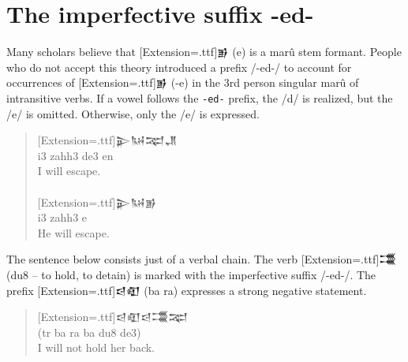\documentclass[a4paper,12pt]{book}
\newcommand{\fcn}{\setmainfont{Akkadian}[Extension=.ttf]}
\newcommand{\fcm}{\large\setmainfont{Akkadian}[Extension=.ttf]}
\begin{document}
\section{The imperfective suffix -ed-}
Many scholars believe that {\fcn 𒂊} (e)
is a marû stem formant. People who do not accept
this theory introduced a prefix /-ed-/ to
account for occurrences of {\fcn 𒂊}  (-e)
in the 3rd person
singular marû of intransitive verbs.
If a vowel follows the \verb|-ed-| prefix,
the /d/ is realized, but
the  /e/ is omitted.
Otherwise, only the /e/ is expressed.\\
\begin{quotation}
\noindent
{\fcm 𒉌𒀄𒉈𒂗}\\
i3 zahh3 de3 en\\
I will escape.\\

\verb||\\
{\fcm 𒉌𒀄𒂊}\\
i3 zahh3 e\\
He will escape.
\end{quotation}

The sentence below consists just of a verbal chain.
The verb {\fcn 𒂃}  (du8 -- to hold, to detain)
is marked with the imperfective suffix /-ed-/.
The prefix {\fcn 𒁀𒊏}  (ba ra) expresses
a strong negative statement.
\begin{quote}
  {\fcm 𒁀𒊏𒁀𒂃𒉈}\\
  (tr ba ra ba du8 de3)\\
  I will not hold her back.
\end{quote}


\printindex
\end{document}
